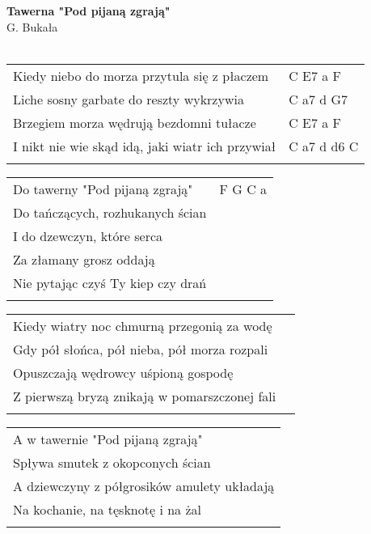 \documentclass[a5paper]{article}
\begin{document}


\noindent
\fontsize{12pt}{15pt}\selectfont
\textbf{Tawerna "Pod pijaną zgrają"} \\
\fontsize{8pt}{10pt}\selectfont
G. Bukała \\ \\
\fontsize{10pt}{12pt}\selectfont
{}
\begin{tabular}{@{}p{8.00cm}p{3cm}@{}}
\noindent
Kiedy niebo do morza przytula się z płaczem & C E7 a F \\
Liche sosny garbate do reszty wykrzywia & C a7 d G7 \\
Brzegiem morza wędrują bezdomni tułacze & C E7 a F \\
I nikt nie wie skąd idą, jaki wiatr ich przywiał & C a7 d d6 C \\ \\
\end{tabular}

\noindent
\begin{tabular}{@{}p{7.00cm}p{3cm}@{}}
Do tawerny "Pod pijaną zgrają" & F G C a \\
Do tańczących, rozhukanych ścian & \\
I do dzewczyn, które serca & \\
Za złamany grosz oddają & \\
Nie pytając czyś Ty kiep czy drań & \\ \\
\end{tabular}

\noindent
\begin{tabular}{@{}p{8.00cm}p{3cm}@{}}
Kiedy wiatry noc chmurną przegonią za wodę \\
Gdy pół słońca, pół nieba, pół morza rozpali \\
Opuszczają wędrowcy uśpioną gospodę \\
Z pierwszą bryzą znikają w pomarszczonej fali \\ \\
\end{tabular}

\noindent
\begin{tabular}{@{}p{7.00cm}@{}}
A w tawernie "Pod pijaną zgrają" \\
Spływa smutek z okopconych ścian \\
A dziewczyny z półgrosików amulety układają \\
Na kochanie, na tęsknotę i na żal \\ \\
\end{tabular}
\end{document}
